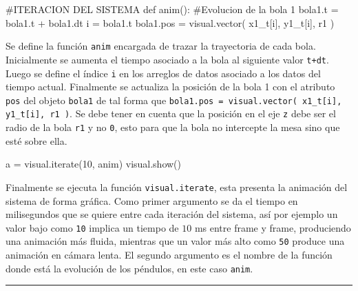 \begin{listing}[style=python, numbers = none]
#ITERACION DEL SISTEMA
def anim(): 
    #Evolucion de la bola 1
    bola1.t = bola1.t + bola1.dt
    i = bola1.t
    bola1.pos = visual.vector( x1_t[i], y1_t[i], r1 )
\end{listing}
Se define la función \texttt{anim} encargada de trazar la trayectoria de 
cada bola. Inicialmente se aumenta el tiempo asociado a la bola al 
siguiente valor \texttt{t+dt}. Luego se define el índice \texttt{i} en los
arreglos de datos asociado a los datos del tiempo actual. Finalmente se 
actualiza la posición de la bola 1 con el atributo \texttt{pos} del objeto
\texttt{bola1} de tal forma que \texttt{bola1.pos = visual.vector( 
x1\_t[i], y1\_t[i], r1 )}. Se debe tener en cuenta que la posición en el 
eje \texttt{z} debe ser el radio de la bola \texttt{r1} y no \texttt{0},
esto para que la bola no intercepte la mesa sino que esté sobre ella.


\begin{listing}[style=python, numbers = none]
a = visual.iterate(10, anim)
visual.show()
\end{listing}
Finalmente se ejecuta la función \texttt{visual.iterate}, esta presenta
la animación del sistema de forma gráfica. Como primer argumento se da el 
tiempo en milisegundos que se quiere entre cada iteración del sistema, así
por ejemplo un valor bajo como \texttt{10} implica un tiempo de $10$ ms 
entre frame y frame, produciendo una animación más fluida, mientras que un
valor más alto como \texttt{50} produce una animación en cámara lenta. El 
segundo argumento es el nombre de la función donde está la evolución de los
péndulos, en este caso \texttt{anim}.


\rule{14cm}{0.5mm}
